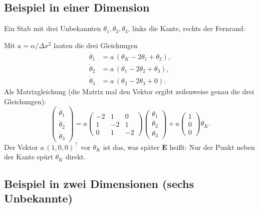 \documentclass[11pt,a4paper]{article}
\numberwithin{equation}{section}
\newcommand{\dx}{\Delta x}
\newcommand{\thK}{\theta_{K}}
\newcommand{\mE}{\mathbf{E}}
\begin{document}
\subsection{Beispiel in einer Dimension}

Ein Stab mit drei Unbekannten $\theta_1,\theta_2,\theta_3$, links die Kante, rechts der Fernrand:
\begin{center}
\end{center}
Mit $a=\alpha/\dx^2$ lauten die drei Gleichungen
\begin{align*}
 \dot\theta_1&=a\,(\thK-2\theta_1+\theta_2),\\
 \dot\theta_2&=a\,(\theta_1-2\theta_2+\theta_3),\\
 \dot\theta_3&=a\,(\theta_2-2\theta_3+0).
\end{align*}
Als Matrixgleichung (die Matrix mal den Vektor ergibt zeilenweise genau die drei Gleichungen):
\begin{equation*}
 \begin{pmatrix}\dot\theta_1\\\dot\theta_2\\\dot\theta_3\end{pmatrix}
 = a\begin{pmatrix}-2&1&0\\1&-2&1\\0&1&-2\end{pmatrix}
 \begin{pmatrix}\theta_1\\\theta_2\\\theta_3\end{pmatrix}
 + a\begin{pmatrix}1\\0\\0\end{pmatrix}\thK .
\end{equation*}
Der Vektor $a\,(1,0,0)^\top$ vor $\thK$ ist das, was später $\mE$ heißt: Nur der Punkt neben der Kante spürt $\thK$ direkt.

\subsection{Beispiel in zwei Dimensionen (sechs Unbekannte)}
\end{document}
